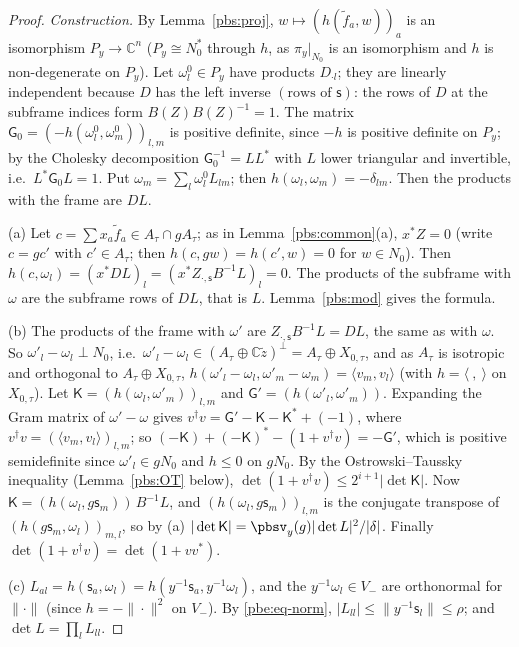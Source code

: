 \documentclass[10pt]{amsart}
\theoremstyle{definition}
\theoremstyle{remark}
\newcommand{\C}{\mathbb C}
\begin{document}
\begin{proof}
\emph{Construction.} By Lemma~\ref{pbs:proj}, $w\mapsto(h(\tilde f_a,w))_a$ is an isomorphism $P_y\to
\C^n$ ($P_y\cong N_0^*$ through $h$, as $\pi_y|_{N_0}$ is an isomorphism and $h$ is non-degenerate on
$P_y$). Let $\omega^0_l\in P_y$ have products $D_{\cdot l}$; they are linearly independent because
$D$ has the left inverse $(\text{rows of }\mathsf s)$: the rows of $D$ at the subframe indices form
$B(Z)B(Z)^{-1}=1$. The matrix $\mathsf G_0=(-h(\omega^0_l,\omega^0_m))_{l,m}$ is positive definite, since $-h$ is
positive definite on $P_y$; by the Cholesky decomposition $\mathsf G_0^{-1}=LL^*$ with $L$ lower
triangular and invertible, i.e.\ $L^*\mathsf G_0L=1$. Put $\omega_m=\sum_l\omega^0_lL_{lm}$; then
$h(\omega_l,\omega_m)=-\delta_{lm}$. Then the products with the frame are $DL$.

(a) Let $c=\sum x_a\tilde f_a\in A_\tau\cap gA_\tau$; as in Lemma~\ref{pbs:common}(a), $x^*Z=0$
(write $c=gc'$ with $c'\in A_\tau$; then $h(c,gw)=h(c',w)=0$ for $w\in N_0$). Then $h(c,\omega_l)=(x^*DL)_l=(x^*Z_{\cdot,\mathsf s}B^{-1}L)_l=0$. The
products of the subframe with $\omega$ are the subframe rows of $DL$, that is $L$. Lemma~\ref{pbs:mod}
gives the formula.

(b) The products of the frame with $\omega'$ are $Z_{\cdot,\mathsf s}B^{-1}L=DL$, the same as with
$\omega$. So $\omega'_l-\omega_l\perp N_0$, i.e.\ $\omega'_l-\omega_l\in(A_\tau\oplus\C\tilde z)^\perp=
A_\tau\oplus X_{0,\tau}$, and as $A_\tau$ is isotropic and orthogonal to $A_\tau\oplus X_{0,\tau}$,
$h(\omega'_l-\omega_l,\omega'_m-\omega_m)=\langle v_m,v_l\rangle$ (with $h=\langle\ ,\ \rangle$ on
$X_{0,\tau}$). Let $\mathsf K=(h(\omega_l,\omega'_m))_{l,m}$ and $\mathsf G'=(h(\omega'_l,\omega'_m))$.
Expanding the Gram matrix of $\omega'-\omega$ gives $v^\dagger v=\mathsf G'-\mathsf K-\mathsf K^*+(-1)$,
where $v^\dagger v=(\langle v_m,v_l\rangle)_{l,m}$; so $(-\mathsf K)+(-\mathsf K)^*-(1+v^\dagger v)=-\mathsf G'$,
which is positive semidefinite since $\omega'_l\in gN_0$ and $h\le0$ on $gN_0$. By the
Ostrowski--Taussky inequality (Lemma~\ref{pbs:OT} below), $\det(1+v^\dagger v)\le2^{i+1}|\det\mathsf K|$.
Now $\mathsf K=(h(\omega_l,g\mathsf s_m))\,B^{-1}L$, and $(h(\omega_l,g\mathsf s_m))_{l,m}$ is the
conjugate transpose of $(h(g\mathsf s_m,\omega_l))_{m,l}$, so by (a) $|\det\mathsf K|=\pbsv_y(g)|\det L|
^2/|\delta|$. Finally $\det(1+v^\dagger v)=\det(1+vv^*)$.

(c) $L_{al}=h(\mathsf s_a,\omega_l)=h(y^{-1}\mathsf s_a,y^{-1}\omega_l)$, and the $y^{-1}\omega_l\in V_-$
are orthonormal for $\|\cdot\|$ (since $h=-\|\cdot\|^2$ on $V_-$). By \eqref{pbe:eq-norm}, $|L_{ll}|\le
\|y^{-1}\mathsf s_l\|\le\rho$; and $\det L=\prod_lL_{ll}$.


\end{proof}
\end{document}
